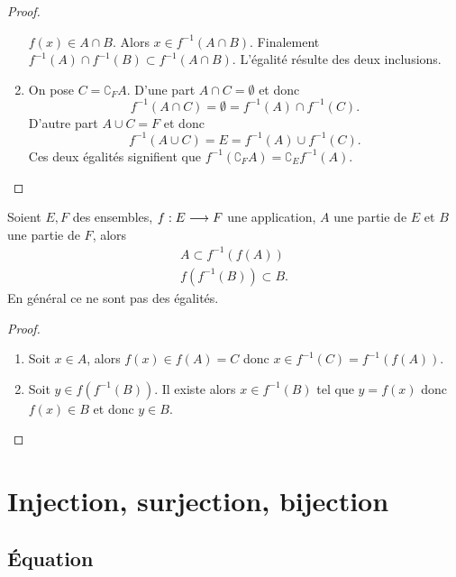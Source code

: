 \begin{proof}
\begin{enumerate}
            \(f(x) \in A \cap B\). Alors \(x \in f^{-1}(A \cap B)\). Finalement 
            \(f^{-1}(A) \cap f^{-1}(B) \subset f^{-1}(A \cap B)\). L'égalité 
            résulte des deux inclusions.
        \item On pose \(C = \complement_F A\). D'une part \(A \cap C  = \emptyset\) 
            et donc
            \begin{equation*}
                f^{-1}(A \cap C) = \emptyset = f^{-1}(A) \cap f^{-1}(C).
            \end{equation*}
            D'autre part \(A \cup C  = F\) et donc
            \begin{equation*}
                f^{-1}(A \cup C) = E = f^{-1}(A) \cup f^{-1}(C).
            \end{equation*}
            Ces deux égalités signifient que \(f^{-1}(\complement_F A) = 
            \complement_E f^{-1}(A)\). 
    \end{enumerate}
\end{proof}

\begin{prop}
    Soient \(E, F\) des ensembles, \(f:E \longrightarrow F\) une application, \(A\) 
    une partie de \(E\) et \(B\) une partie de \(F\), alors
    \begin{gather}
        A \subset f^{-1}(f(A)) \\
        f(f^{-1}(B)) \subset B.
    \end{gather}
    En général ce ne sont pas des égalités.
\end{prop}

\begin{proof}
    \begin{enumerate}
        \item Soit \(x \in A\), alors \(f(x) \in f(A) = C\) donc \(x \in 
            f^{-1}(C) = f^{-1}(f(A))\).
        \item Soit \(y \in f(f^{-1}(B))\). Il existe alors \(x \in f^{-1}(B)\) 
            tel que \(y = f(x)\) donc \(f(x) \in B\) et donc \(y \in B\).
    \end{enumerate}
\end{proof}

\section{Injection, surjection, bijection}
\label{chap3-sec:injsurbij}

\subsection{Équation}
\label{chap3-subsec:equation}

